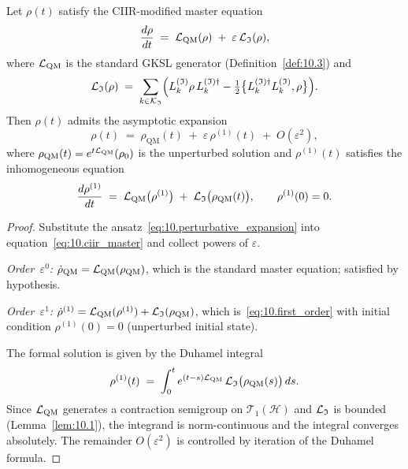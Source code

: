 \begin{theorem}
\label{thm:10.3}
Let $\rho(t)$ satisfy the CIIR-modified master equation
\begin{equation}
\label{eq:10.ciir_master}
  \frac{d\rho}{dt}
  \;=\;
  \mathcal{L}_{\mathrm{QM}}(\rho)
  \;+\;
  \varepsilon\,\mathcal{L}_{\mathfrak{I}}(\rho),
\end{equation}
where $\mathcal{L}_{\mathrm{QM}}$ is the standard GKSL generator
(Definition~\ref{def:10.3}) and
\[
  \mathcal{L}_{\mathfrak{I}}(\rho)
  \;=\;
  \sum_{k\in\mathcal{K}_{\mathfrak{I}}}
  \Bigl(
    L_k^{(\mathfrak{I})}\rho\,L_k^{(\mathfrak{I})\dagger}
    -\tfrac{1}{2}\bigl\{L_k^{(\mathfrak{I})\dagger}L_k^{(\mathfrak{I})},\rho\bigr\}
  \Bigr).
\]
Then $\rho(t)$ admits the asymptotic expansion
\begin{equation}
\label{eq:10.perturbative_expansion}
  \rho(t)
  \;=\;
  \rho_{\mathrm{QM}}(t)
  \;+\;
  \varepsilon\,\rho^{(1)}(t)
  \;+\;
  O(\varepsilon^2),
\end{equation}
where $\rho_{\mathrm{QM}}(t)=e^{t\mathcal{L}_{\mathrm{QM}}}(\rho_0)$ is the
unperturbed solution and $\rho^{(1)}(t)$ satisfies the inhomogeneous
equation
\begin{equation}
\label{eq:10.first_order}
  \frac{d\rho^{(1)}}{dt}
  \;=\;
  \mathcal{L}_{\mathrm{QM}}\bigl(\rho^{(1)}\bigr)
  \;+\;
  \mathcal{L}_{\mathfrak{I}}\bigl(\rho_{\mathrm{QM}}(t)\bigr),
  \qquad
  \rho^{(1)}(0) = 0.
\end{equation}
\end{theorem}

\begin{proof}
Substitute the ansatz~\eqref{eq:10.perturbative_expansion} into
equation~\eqref{eq:10.ciir_master} and collect powers of
$\varepsilon$.

\emph{Order~$\varepsilon^0$:}
$\dot\rho_{\mathrm{QM}} = \mathcal{L}_{\mathrm{QM}}(\rho_{\mathrm{QM}})$,
which is the standard master equation; satisfied by hypothesis.

\emph{Order~$\varepsilon^1$:}
$\dot\rho^{(1)} = \mathcal{L}_{\mathrm{QM}}(\rho^{(1)})
+ \mathcal{L}_{\mathfrak{I}}(\rho_{\mathrm{QM}})$,
which is~\eqref{eq:10.first_order} with initial condition
$\rho^{(1)}(0)=0$ (unperturbed initial state).

The formal solution is given by the Duhamel integral
\[
  \rho^{(1)}(t)
  \;=\;
  \int_0^t
  e^{(t-s)\mathcal{L}_{\mathrm{QM}}}\,
  \mathcal{L}_{\mathfrak{I}}\bigl(\rho_{\mathrm{QM}}(s)\bigr)\,ds.
\]
Since $\mathcal{L}_{\mathrm{QM}}$ generates a contraction semigroup on
$\mathcal{T}_1(\mathcal{H})$ and $\mathcal{L}_{\mathfrak{I}}$ is bounded
(Lemma~\ref{lem:10.1}), the integrand is norm-continuous and the
integral converges absolutely.  The remainder
$O(\varepsilon^2)$ is controlled by iteration of the Duhamel formula.
\end{proof}

